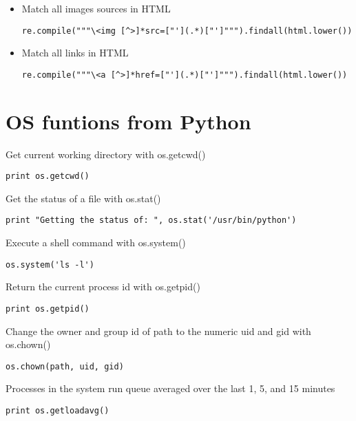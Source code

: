 \documentclass[justified,sixbynine]{tufte-book}
\theoremstyle{plain}%
\theoremstyle{definition}
\theoremstyle{remark}
\begin{document}
\begin{fullwidth}
\begin{itemize}
\item Match all images sources in HTML
\begin{lstlisting}
re.compile("""\<img [^>]*src=["'](.*)["']""").findall(html.lower())
\end{lstlisting}

\item Match all links in HTML
\begin{lstlisting}
re.compile("""\<a [^>]*href=["'](.*)["']""").findall(html.lower())
\end{lstlisting}

\end{itemize}


\goodbreak\chapter{OS funtions from Python}

Get current working directory with os.getcwd()

\begin{lstlisting}
print os.getcwd()
\end{lstlisting}

Get the status of a file with os.stat()

\begin{lstlisting}
print "Getting the status of: ", os.stat('/usr/bin/python')
\end{lstlisting}

Execute a shell command with os.system()

\begin{lstlisting}
os.system('ls -l')
\end{lstlisting}

Return the current process id with os.getpid()

\begin{lstlisting}
print os.getpid()
\end{lstlisting}

Change the owner and group id of path to the numeric uid and gid with os.chown()

\begin{lstlisting}
os.chown(path, uid, gid)
\end{lstlisting}

Processes in the system run queue averaged over the last 1, 5, and 15 minutes

\begin{lstlisting}
print os.getloadavg()
\end{lstlisting}


\end{fullwidth}
\end{document}
